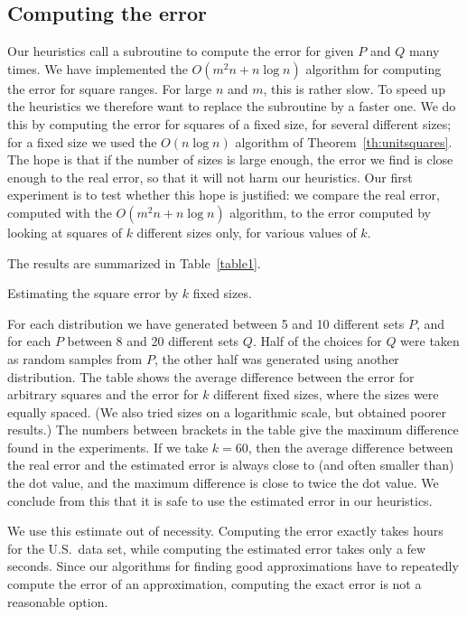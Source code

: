 \documentclass{elsart}
\begin{document}
\subsection{Computing the error}
Our heuristics call a subroutine to compute the error for given $P$
and $Q$ many times. We have implemented the $O(m^{2} n + n \log n)$
algorithm for computing the error for square ranges.  For large $n$
and $m$, this is rather slow. To speed up the heuristics we therefore
want to replace the subroutine by a faster one.  We do this by
computing the error for squares of a fixed size, for several different
sizes; for a fixed size we used the $O(n \log n)$ algorithm of
Theorem~\ref{th:unitsquares}.  The hope is that if the number of sizes
is large enough, the error we find is close enough to the real error,
so that it will not harm our heuristics. Our first experiment is to
test whether this hope is justified: we compare the real error,
computed with the $O(m^{2} n + n \log n)$ algorithm, to the error
computed by looking at squares of $k$ different sizes only, for
various values of $k$.

The results are summarized in Table~\ref{table1}.
\begin{table}
{\tiny }
\caption{Estimating the square error by $k$ fixed sizes.}
\label{table1}
\end{table}

For each distribution we have generated between 5 and 10 different
sets $P$, and for each $P$ between 8 and 20 different sets $Q$.  Half
of the choices for $Q$ were taken as random samples from $P$, the
other half was generated using another distribution.  The table shows
the average difference between the error for arbitrary squares and the
error for $k$ different fixed sizes, where the sizes were equally
spaced. (We also tried sizes on a logarithmic scale, but obtained
poorer results.) The numbers between brackets in the table give the
maximum difference found in the experiments.  If we take $k=60$, then
the average difference between the real error and the estimated error
is always close to (and often smaller than) the dot value, and the
maximum difference is close to twice the dot value.  We conclude from
this that it is safe to use the estimated error in our heuristics.

We use this estimate out of necessity.  Computing the error exactly
takes hours for the U.S.\ data set, while computing the estimated
error takes only a few seconds.  Since our algorithms for finding good
approximations have to repeatedly compute the error of an
approximation, computing the exact error is not a reasonable option.
\end{document}
